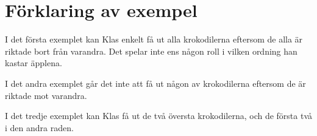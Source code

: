 \section*{Förklaring av exempel}

I det första exemplet kan Klas enkelt få ut alla krokodilerna eftersom de alla är riktade bort
från varandra. Det spelar inte ens någon roll i vilken ordning han kastar äpplena.

I det andra exemplet går det inte att få ut någon av krokodilerna eftersom de är riktade mot varandra.

I det tredje exemplet kan Klas få ut de två översta krokodilerna, och de första två i den andra raden. 

